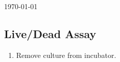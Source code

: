 \documentclass[11pt, oneside]{article}   	%
\begin{document}
\today %

\subsection{Live/Dead Assay} %

\begin{enumerate}

\item Remove culture from incubator.


\end{enumerate}
\end{document}

